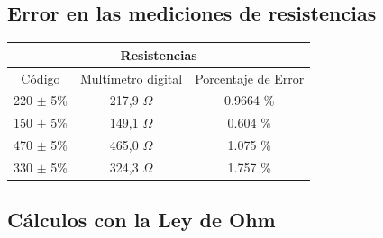 \documentclass[letterpaper, 12pt]{report}
\begin{document}
\subsection{Error en las mediciones de resistencias}

\begin{table}[H]
	\begin{center}
		\begin{tabular}{|c|c|c|}
			\multicolumn{3}{c}{Resistencias}                         \\ \hline
			Código        & Multímetro digital & Porcentaje de Error \\ \hline
			220 $\pm$ 5\% & 217,9 $\Omega$     & 0.9664 \%           \\ \hline
			150 $\pm$ 5\% & 149,1 $\Omega$     & 0.604  \%           \\ \hline
			470 $\pm$ 5\% & 465,0 $\Omega$     & 1.075  \%           \\ \hline
			330 $\pm$ 5\% & 324,3 $\Omega$     & 1.757  \%           \\ \hline
		\end{tabular}
	\end{center}
\end{table}

\subsection{Cálculos con la Ley de Ohm}
\end{document}
